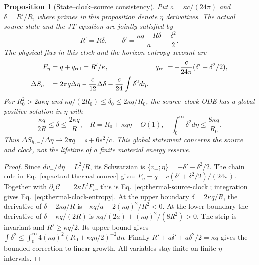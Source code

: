 \documentclass[12pt,a4paper]{article}
\newtheorem{proposition}[theorem]{Proposition}
\begin{document}
\begin{proposition}[State--clock--source consistency]
\label{prop:thermal-source-clock}
Put $a=\kappa c/(24\pi)$ and $\delta=R'/R$, where primes in this
proposition denote $\eta$ derivatives. The actual source state and the
JT equation are jointly satisfied by
\begin{equation}\label{eq:thermal-source-clock}
 R'=R\delta,\qquad
 \delta'=\frac{\kappa q-R\delta}{a}-\frac{\delta^2}{2}.
\end{equation}
The physical flux in this clock and the horizon entropy account are
\begin{align}
 F_\eta&=q+q_{\rm ref}=R'/\kappa,&
 q_{\rm ref}&=-\frac{c}{24\pi}(\delta'+\delta^2/2),\nonumber\\
 \Delta S_{h,-}&=2\pi q\Delta\eta
       -\frac c{12}\Delta\delta
       -\frac c{24}\int\delta^2d\eta.
                    \label{eq:thermal-clock-entropy}
\end{align}
For $R_0^2>2a\kappa q$ and
$\kappa q/(2R_0)\le\delta_0\le2\kappa q/R_0$, the source--clock ODE
has a global positive solution in $\eta$ with
\begin{equation}\label{eq:thermal-clock-growth}
 \frac{\kappa q}{2R}\le\delta\le\frac{2\kappa q}{R},\quad
 R=R_0+\kappa q\eta+O(1),\quad
 \int_0^\infty\delta^2d\eta\le\frac{8\kappa q}{R_0}.
\end{equation}
Thus $\Delta S_{h,-}/\Delta\eta\to2\pi q=s+6s^2/c$.
This global statement concerns the source and clock, not the lifetime
of a finite material energy reserve.
\end{proposition}
\begin{proof}
Since $dv_-/d\eta=L^2/R$, its Schwarzian is
$\{v_-;\eta\}=-\delta'-\delta^2/2$.
The chain rule in Eq.~\eqref{eq:actual-thermal-source} gives
$F_\eta=q-c(\delta'+\delta^2/2)/(24\pi)$.
Together with $\partial_v\mathcal C_-=2\kappa L^2F_{vv}$ this is
Eq.~\eqref{eq:thermal-source-clock}; integration gives
Eq.~\eqref{eq:thermal-clock-entropy}.
At the upper boundary $\delta=2\kappa q/R$, the derivative of
$\delta-2\kappa q/R$ is
$-\kappa q/a+2(\kappa q)^2/R^2<0$.
At the lower boundary the derivative of
$\delta-\kappa q/(2R)$ is
$\kappa q/(2a)+(\kappa q)^2/(8R^2)>0$.
The strip is invariant and $R'\ge\kappa q/2$.
Its upper bound gives
$\int\delta^2\le\int_0^\infty4(\kappa q)^2
 (R_0+\kappa q\eta/2)^{-2}d\eta$.
Finally $R'+a\delta'+a\delta^2/2=\kappa q$ gives the bounded correction
to linear growth. All variables stay finite on finite $\eta$ intervals.
\end{proof}
\end{document}
